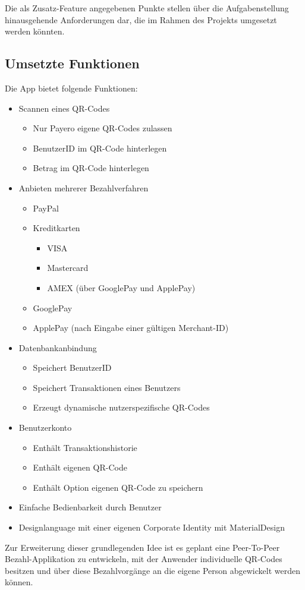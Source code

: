 Die als Zusatz-Feature angegebenen Punkte stellen über die Aufgabenstellung hinausgehende Anforderungen dar, die im Rahmen des Projekts umgesetzt werden könnten.


\subsection{Umsetzte Funktionen}

Die App bietet folgende Funktionen:

\begin{itemize}
    \item Scannen eines QR-Codes
    \begin{itemize}
        \item Nur Payero eigene QR-Codes zulassen
        \item BenutzerID im QR-Code hinterlegen
        \item Betrag im QR-Code hinterlegen
    \end{itemize}
    \item Anbieten mehrerer Bezahlverfahren
    \begin{itemize}
        \item PayPal
        \item Kreditkarten
        \begin{itemize}
            \item VISA
            \item Mastercard
            \item AMEX (über GooglePay und ApplePay)
        \end{itemize}
        \item GooglePay
        \item ApplePay (nach Eingabe einer gültigen Merchant-ID)
    \end{itemize}
    \item Datenbankanbindung
    \begin{itemize}
        \item Speichert BenutzerID
        \item Speichert Transaktionen eines Benutzers
        \item Erzeugt dynamische nutzerspezifische QR-Codes
    \end{itemize}
    \item Benutzerkonto
    \begin{itemize}
        \item Enthält Transaktionshistorie
        \item Enthält eigenen QR-Code
        \item Enthält Option eigenen QR-Code zu speichern
    \end{itemize}
    \item Einfache Bedienbarkeit durch Benutzer
    \item Designlanguage mit einer eigenen Corporate Identity mit MaterialDesign
\end{itemize}

Zur Erweiterung dieser grundlegenden Idee ist es geplant eine Peer-To-Peer Bezahl-Applikation zu entwickeln, mit der Anwender individuelle QR-Codes besitzen und über diese Bezahlvorgänge an die eigene Person abgewickelt werden können.